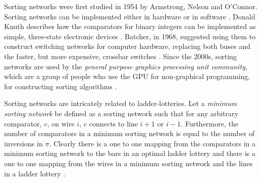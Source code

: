Sorting networks were first studied in 1954 by Armstrong, Nelson and O'Connor. 
Sorting networks can be implemented either in hardware or in software \cite{A18}.
Donald Knuth describes how the comparators for binary integers can be implemented as simple, 
three-state electronic devices \cite{A18}. Batcher, in 1968, 
suggested using them to construct switching networks for computer hardware, replacing 
both buses and the faster, but more expensive, crossbar switches \cite{A27}. Since the 2000s, sorting networks are used by the 
\emph{general purpose graphics processing unit community}, which are a group of people who use 
the GPU for non-graphical programming, for constructing sorting algorithms \cite{A28}.\par 
Sorting networks are intricately related to ladder-lotteries. Let a \emph{minimum sorting network} be defined 
as a sorting network such that for any arbitrary comparator, $c$, on wire $i$, $c$ connects to line $i+1$ or $i-1$. Furthermore, 
the number of comparators in a minimum sorting network is equal to the number of inversions in $\pi$. Clearly there is a 
one to one mapping from the comparators in a minimum sorting network to the bars in an optimal ladder lottery and there 
is a one to one mapping from the wires in a minimum sorting network and the lines in a ladder lottery \cite{A29}. 


 
